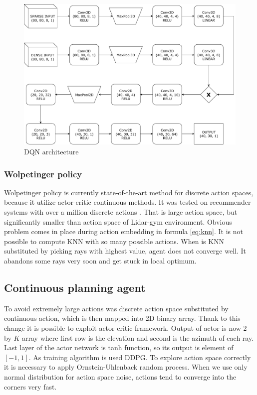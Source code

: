 \vspace{3mm}
\begin{figure}[!h]
\centering
\includegraphics[scale=0.6]{fig/dql.pdf}
\caption{DQN architecture}
\label{fig:dqn}
\end{figure}

\subsubsection{Wolpetinger policy}
Wolpetinger policy is currently state-of-the-art method for discrete action spaces, because it utilize actor-critic continuous methods. It was tested on recommender systems with over a million discrete actions \cite{dulac2015}. That is large action space, but significantly smaller than action space of Lidar-gym environment. Obvious problem comes in place during action embedding in formula \eqref{eq:knn}. It is not possible to compute KNN with so many possible actions. When is KNN substituted by picking rays with highest value, agent does not converge well. It abandons some rays very soon and get stuck in local optimum.

\clearpage
\subsection{Continuous planning agent}
To avoid extremely large actions was discrete action space substituted by continuous action, which is then mapped into 2D binary array. Thank to this change it is possible to exploit actor-critic framework. Output of actor is now $2$ by $K$ array where first row is the elevation and second is the azimuth of each ray. Last layer of the actor network is tanh function, so its output is element of $[-1, 1]$. As training algorithm is used DDPG. To explore action space correctly it is necessary to apply Ornstein-Uhlenback random process. When we use only normal distribution for action space noise, actions tend to converge into the corners very fast.